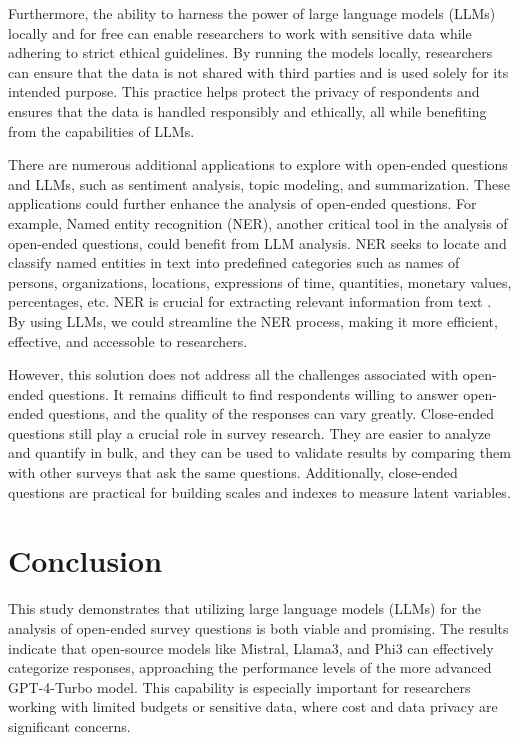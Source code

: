 \documentclass[
  authoryear,
  preprint,
  3p]{elsarticle}
\begin{document}
Furthermore, the ability to harness the power of large language models
(LLMs) locally and for free can enable researchers to work with
sensitive data while adhering to strict ethical guidelines. By running
the models locally, researchers can ensure that the data is not shared
with third parties and is used solely for its intended purpose. This
practice helps protect the privacy of respondents and ensures that the
data is handled responsibly and ethically, all while benefiting from the
capabilities of LLMs.

There are numerous additional applications to explore with open-ended
questions and LLMs, such as sentiment analysis, topic modeling, and
summarization. These applications could further enhance the analysis of
open-ended questions. For example, Named entity recognition (NER),
another critical tool in the analysis of open-ended questions, could
benefit from LLM analysis. NER seeks to locate and classify named
entities in text into predefined categories such as names of persons,
organizations, locations, expressions of time, quantities, monetary
values, percentages, etc. NER is crucial for extracting relevant
information from text \citep{yadav_bethard19}. By using LLMs, we could
streamline the NER process, making it more efficient, effective, and
accessoble to researchers.

However, this solution does not address all the challenges associated
with open-ended questions. It remains difficult to find respondents
willing to answer open-ended questions, and the quality of the responses
can vary greatly. Close-ended questions still play a crucial role in
survey research. They are easier to analyze and quantify in bulk, and
they can be used to validate results by comparing them with other
surveys that ask the same questions. Additionally, close-ended questions
are practical for building scales and indexes to measure latent
variables.

\section{Conclusion}\label{conclusion}

This study demonstrates that utilizing large language models (LLMs) for
the analysis of open-ended survey questions is both viable and
promising. The results indicate that open-source models like Mistral,
Llama3, and Phi3 can effectively categorize responses, approaching the
performance levels of the more advanced GPT-4-Turbo model. This
capability is especially important for researchers working with limited
budgets or sensitive data, where cost and data privacy are significant
concerns.
\end{document}
